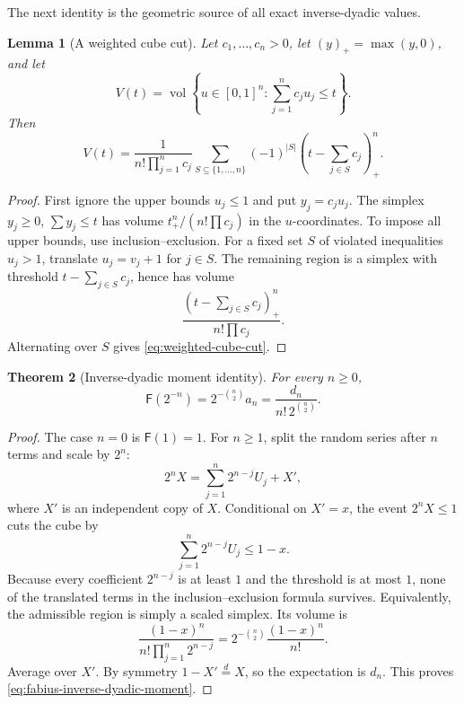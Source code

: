 \documentclass[11pt,oneside,openany]{book}
\newtheorem{theorem}{Theorem}[chapter]
\newtheorem{lemma}[theorem]{Lemma}
\theoremstyle{definition}
\theoremstyle{remark}
\newcommand{\Fab}{\mathsf F}
\begin{document}
The next identity is the geometric source of all exact inverse-dyadic values.

\begin{lemma}[A weighted cube cut]\label{lem:weighted-cube-cut}
Let $c_1,\ldots,c_n>0$, let $(y)_+=\max(y,0)$, and let
\[
 V(t)=\operatorname{vol}\left\{u\in[0,1]^n:
                   \sum_{j=1}^nc_ju_j\le t\right\}.
\]
Then
\begin{equation}\label{eq:weighted-cube-cut}
 V(t)=\frac1{n!\prod_{j=1}^nc_j}
 \sum_{S\subseteq\{1,\ldots,n\}}(-1)^{|S|}
 \left(t-\sum_{j\in S}c_j\right)_+^n.
\end{equation}
\end{lemma}

\begin{proof}
First ignore the upper bounds $u_j\le1$ and put $y_j=c_ju_j$.  The simplex
$y_j\ge0$, $\sum y_j\le t$ has volume
$t_+^n/(n!\prod c_j)$ in the $u$-coordinates.  To impose all upper bounds,
use inclusion--exclusion.  For a fixed set $S$ of violated inequalities
$u_j>1$, translate $u_j=v_j+1$ for $j\in S$.  The remaining region is a
simplex with threshold $t-\sum_{j\in S}c_j$, hence has volume
\[
 \frac{(t-\sum_{j\in S}c_j)_+^n}{n!\prod c_j}.
\]
Alternating over $S$ gives \eqref{eq:weighted-cube-cut}.
\end{proof}

\begin{theorem}[Inverse-dyadic moment identity]\label{thm:fabius-inverse-dyadic-moment}
For every $n\ge0$,
\begin{equation}\label{eq:fabius-inverse-dyadic-moment}
 \boxed{
 \Fab(2^{-n})=2^{-\binom n2}a_n
 =\frac{d_n}{n!\,2^{\binom n2}}.}
\end{equation}
\end{theorem}

\begin{proof}
The case $n=0$ is $\Fab(1)=1$.  For $n\ge1$, split the random series after
$n$ terms and scale by $2^n$:
\begin{equation}\label{eq:fabius-scaled-split}
 2^nX=\sum_{j=1}^n2^{n-j}U_j+X',
\end{equation}
where $X'$ is an independent copy of $X$.  Conditional on $X'=x$, the event
$2^nX\le1$ cuts the cube by
\[
 \sum_{j=1}^n2^{n-j}U_j\le1-x.
\]
Because every coefficient $2^{n-j}$ is at least $1$ and the threshold is at
most $1$, none of the translated terms in the inclusion--exclusion formula
survives.  Equivalently, the admissible region is simply a scaled simplex.
Its volume is
\[
 \frac{(1-x)^n}{n!\prod_{j=1}^n2^{n-j}}
 =2^{-\binom n2}\frac{(1-x)^n}{n!}.
\]
Average over $X'$.  By symmetry $1-X'\overset d=X$, so the expectation is
$d_n$.  This proves \eqref{eq:fabius-inverse-dyadic-moment}.
\end{proof}
\end{document}
